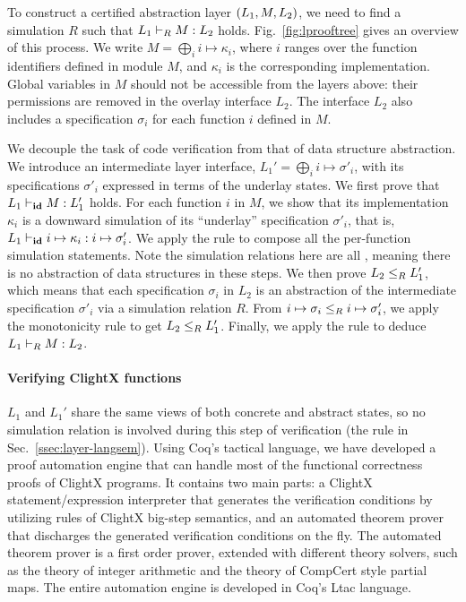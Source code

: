 To construct a certified abstraction layer $(L_1,M,L_2)$, we
need to find a simulation $R$ such that $L_1 \vdash_{R} M : L_2$ holds.
Fig.~\ref{fig:lprooftree} gives an overview of this process.  We write
$M = \bigoplus_i i \mapsto \kappa_i$, where $i$ ranges over the
function identifiers defined in module $M$, and $\kappa_i$ is the
corresponding implementation.  Global variables in $M$ should not
be accessible from the layers above: their permissions are removed in
the overlay interface $L_2$.  The interface $L_2$ also includes a
specification $\sigma_i$ for each function $i$ defined in $M$.

We decouple the task of code verification from that of data structure
abstraction. We introduce an intermediate layer interface, $L_1'=\bigoplus_i i \mapsto \sigma'_i$, with its specifications
$\sigma'_i$ expressed in terms of the underlay states.
We first prove that $L_1 \vdash_{\textbf{id}} M : L_1'$ holds.  For each
function $i$ in $M$, we show that its implementation $\kappa_i$ is a
downward simulation of its ``underlay'' specification $\sigma'_i$,
that is, $L_1 \vdash_{\textbf{id}} i \mapsto \kappa_i : i \mapsto
  \sigma'_i$. We apply the  rule to compose all the
per-function simulation statements.  Note the simulation
relations here are all \id, meaning there is no abstraction of
data structures in these steps.
%
% 
We then prove $L_2 \le_{R} L_1'$, which means that each specification
$\sigma_i$ in $L_2$ is an abstraction of the intermediate specification
$\sigma'_i$ via a simulation relation $R$.  
From $i \mapsto \sigma_i \le_{R} i \mapsto \sigma'_i$,  
we apply the monotonicity rule  to 
get $L_2 \le_{R} L_1'$. Finally, we apply the  rule
to deduce $L_1 \vdash_{R} M : L_2$. 

\paragraph{Verifying ClightX functions}
$L_1$ and $L_1'$ share the same views of both concrete and abstract states,
so no simulation relation is involved during this step of verification
(the  rule in Sec.~\ref{ssec:layer-langsem}).
Using Coq's tactical language,
we have developed a proof automation engine
that can handle most of the functional correctness proofs of
ClightX programs. It contains two main parts: a ClightX
statement/expression interpreter that generates the verification
conditions by utilizing rules of ClightX big-step semantics,
and an automated theorem prover that discharges
the generated verification conditions on the fly. 
The automated theorem prover is a first order prover,
extended with different theory solvers, such as the theory
of integer arithmetic and the theory of CompCert style partial maps.
The entire automation engine is developed in Coq's Ltac language.


